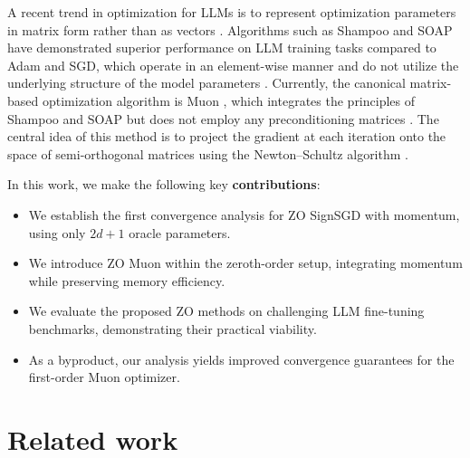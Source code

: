 \documentclass{article}
\theoremstyle{plain}
\theoremstyle{definition}
\theoremstyle{remark}
\begin{document}
A recent trend in optimization for LLMs is to represent optimization parameters in matrix form rather than as vectors \cite{bernstein2024old, bernstein2024modular, pethick2025training}. Algorithms such as Shampoo \cite{gupta2018shampoo} and SOAP \cite{vyas2024soap} have demonstrated superior performance on LLM training tasks compared to Adam and SGD, which operate in an element-wise manner and do not utilize the underlying structure of the model parameters \cite{dahl2023benchmarking}. Currently, the canonical matrix-based optimization algorithm is Muon \cite{muon_base, muon_scaled, muon_convergence}, which integrates the principles of Shampoo and SOAP but does not employ any preconditioning matrices \cite{muon_base}. The central idea of this method is to project the gradient at each iteration onto the space of semi-orthogonal matrices using the Newton–Schultz algorithm \cite{bernstein2024old}.


In this work, we make the following key \textbf{contributions}:
\begin{itemize}
    \item We establish the first convergence analysis for ZO SignSGD with momentum, using only $2d+1$ oracle parameters.
    \item We introduce ZO Muon within the zeroth-order setup, integrating momentum while preserving memory efficiency.
    \item We evaluate the proposed ZO methods on challenging LLM fine-tuning benchmarks, demonstrating their practical viability.
    \item As a byproduct, our analysis yields improved convergence guarantees for the first-order Muon optimizer.
\end{itemize}

\section{Related work} \label{sec:rw}
\end{document}
